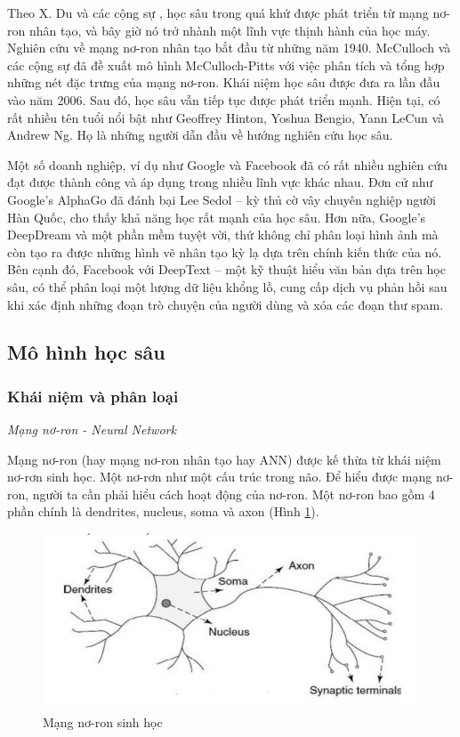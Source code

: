Theo X. Du và các cộng sự \cite{25-Du}, học sâu trong quá khứ được phát triển từ mạng nơ-ron nhân tạo, và bây giờ nó trở nhành một lĩnh vực thịnh hành của học máy. Nghiên cứu về mạng nơ-ron nhân tạo bắt đầu từ những năm 1940. McCulloch và các cộng sự \cite{26-McCulloch} đã đề xuất mô hình McCulloch-Pitts với việc phân tích và tổng hợp những nét đặc trưng của mạng nơ-ron. Khái niệm học sâu được đưa ra lần đầu vào năm 2006. Sau đó, học sâu vẫn tiếp tục được phát triển mạnh. Hiện tại, có rất nhiều tên tuổi nổi bật như Geoffrey Hinton, Yoshua Bengio, Yann LeCun và Andrew Ng. Họ là những người dẫn đầu về hướng nghiên cứu học sâu. 

Một số doanh nghiệp, ví dụ như Google và Facebook đã có rất nhiều nghiên cứu đạt được thành công và áp dụng trong nhiều lĩnh vực khác nhau. Đơn cử như Google’s AlphaGo đã đánh bại Lee Sedol – kỳ thủ cờ vây chuyên nghiệp người Hàn Quốc, cho thấy khả năng học rất mạnh của học sâu. Hơn nữa, Google’s DeepDream và một phần mềm tuyệt vời, thứ không chỉ phân loại hình ảnh mà còn tạo ra được những hình vẽ nhân tạo kỳ lạ dựa trên chính kiến thức của nó. Bên cạnh đó, Facebook với DeepText – một kỹ thuật hiểu văn bản dựa trên học sâu, có thể phân loại một lượng dữ liệu khổng lồ, cung cấp dịch vụ phản hồi sau khi xác định những đoạn trò chuyện của người dùng và xóa các đoạn thư spam.

\subsection{Mô hình học sâu}

\subsubsection{Khái niệm và phân loại}

\textit{Mạng nơ-ron - Neural Network}

Mạng nơ-ron (hay mạng nơ-ron nhân tạo hay ANN) được kế thừa từ khái niệm nơ-rơn sinh học. Một nơ-rơn như một cấu trúc trong não. Để hiểu được mạng nơ-ron, người ta cần phải hiểu cách hoạt động của nơ-ron. Một nơ-ron bao gồm 4 phần chính là dendrites, nucleus, soma và axon (Hình \ref{fig:bio-nn}). 

\begin{figure}[ht!]
	\centering
	\includegraphics[width=0.75\linewidth]{fig/bio-nn.png}
	\caption{Mạng nơ-ron sinh học}
	\label{fig:bio-nn}
\end{figure}

